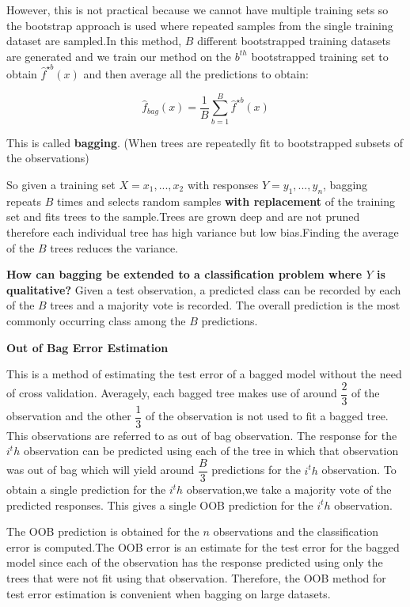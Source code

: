 However, this is not practical because we cannot have multiple training sets so the bootstrap approach is used where repeated samples from the single training dataset are sampled.In this method, $B$ different bootstrapped training datasets are generated and we train our method on the $b^{th}$ bootstrapped training set to obtain $\hat{f}^{\star b}(x)$ and then average all the predictions to obtain:

\begin{equation}
\hat{f}_{bag}(x)=\dfrac{1}{B} \sum_{b=1}^{B} \hat{f}^{\star b}(x)
\end{equation}

This is called \textbf{bagging}. (When trees are repeatedly fit to bootstrapped subsets of the observations)

So given a training set $X=x_1,...,x_2$ with responses $Y=y_1,...,y_n$, bagging repeats $B$ times and selects random samples \textbf{with replacement} of the training set and fits trees to the sample.Trees are grown deep and are not pruned therefore each individual tree has high variance but low bias.Finding the average of the $B$ trees reduces the variance.

\textbf{How can bagging be extended to a classification problem where $Y$ is qualitative?} Given a test observation, a predicted class can be recorded by each of the $B$ trees and a majority vote is recorded. The overall prediction is the most commonly occurring class among the $B$ predictions.

\begin{center}
\textbf{Out of Bag Error Estimation}
\end{center}

This is a method of estimating the test error of a bagged model without the need of cross validation. Averagely, each bagged tree makes use of around $\dfrac{2}{3}$ of the observation and the other $\dfrac{1}{3}$ of the observation is not used to fit a bagged tree. This observations are referred to as out of bag observation. The response for the $i^th$ observation can be predicted using each of the tree in which that observation was out of bag which will yield around  $\dfrac{B}{3}$ predictions for the $i^th$ observation. To obtain a single prediction for the $i^th$ observation,we take a majority vote of the predicted responses. This gives a single OOB prediction for the $i^th$ observation.

The OOB prediction is obtained for the $n$ observations and the classification error is computed.The OOB error is an estimate for the test error for the bagged model since each of the observation has the response predicted using only the trees that were not fit using that observation. Therefore, the OOB method for test error estimation is convenient when bagging on large datasets. 

